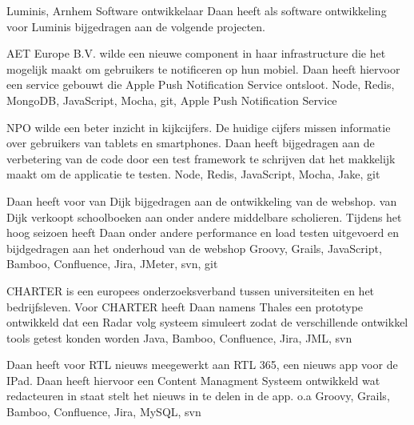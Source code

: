 	\begin{workExperience}{Luminis, Arnhem}%
	{Software ontwikkelaar}{}
		Daan heeft als software ontwikkeling voor Luminis bijgedragen aan de
		volgende projecten.

		AET Europe B.V. wilde een nieuwe component in haar
                infrastructure die het mogelijk maakt om gebruikers te
                notificeren op hun mobiel. Daan heeft hiervoor een
                service gebouwt die Apple Push Notification Service
                ontsloot.
                \technics Node, Redis, MongoDB, JavaScript, Mocha,
                git, Apple Push Notification Service

                NPO wilde een beter inzicht in kijkcijfers. De huidige
                cijfers missen informatie over gebruikers van tablets
                en smartphones. Daan heeft bijgedragen aan de
                verbetering van de code door een test framework te
                schrijven dat het makkelijk maakt om de applicatie te
                testen.
                \technics Node, Redis, JavaScript, Mocha, Jake, git

                Daan heeft voor van Dijk bijgedragen aan de
                ontwikkeling van de webshop. van Dijk verkoopt
                schoolboeken aan onder andere middelbare
                scholieren. Tijdens het hoog seizoen heeft Daan onder
                andere performance en load testen uitgevoerd en
                bijdgedragen aan het onderhoud van de webshop
                \technics Groovy, Grails, JavaScript, Bamboo,
                Confluence, Jira, JMeter, svn, git

                CHARTER is een europees onderzoeksverband tussen
                universiteiten en het bedrijfsleven. Voor CHARTER
                heeft Daan namens Thales een prototype ontwikkeld dat
                een Radar volg systeem simuleert zodat de
                verschillende ontwikkel tools getest konden worden
                \technics Java, Bamboo, Confluence, Jira, JML, svn

                Daan heeft voor RTL nieuws meegewerkt aan RTL 365, een
                nieuws app voor de IPad. Daan heeft hiervoor een
                Content Managment Systeem ontwikkeld wat redacteuren
                in staat stelt het nieuws in te delen in de app.
                \technics o.a Groovy, Grails, Bamboo, Confluence,
                Jira, MySQL, svn
	\end{workExperience}

